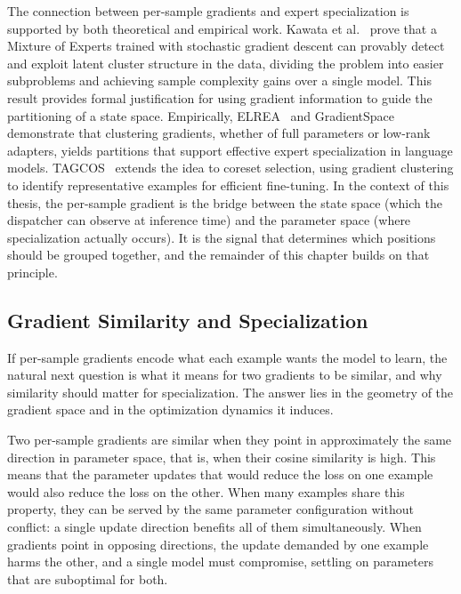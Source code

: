 The connection between per-sample gradients and expert specialization is supported by both theoretical and empirical work. Kawata et al.~\cite{kawata2025moe} prove that a Mixture of Experts trained with stochastic gradient descent can provably detect and exploit latent cluster structure in the data, dividing the problem into easier subproblems and achieving sample complexity gains over a single model. This result provides formal justification for using gradient information to guide the partitioning of a state space. Empirically, ELREA~\cite{li2025elrea} and GradientSpace~\cite{sridharan2025gradientspace} demonstrate that clustering gradients, whether of full parameters or low-rank adapters, yields partitions that support effective expert specialization in language models. TAGCOS~\cite{zhang2024tagcos} extends the idea to coreset selection, using gradient clustering to identify representative examples for efficient fine-tuning. In the context of this thesis, the per-sample gradient is the bridge between the state space (which the dispatcher can observe at inference time) and the parameter space (where specialization actually occurs). It is the signal that determines which positions should be grouped together, and the remainder of this chapter builds on that principle.

\subsection{Gradient Similarity and Specialization}\label{sec:gradient-similarity}

If per-sample gradients encode what each example wants the model to learn, the natural next question is what it means for two gradients to be similar, and why similarity should matter for specialization. The answer lies in the geometry of the gradient space and in the optimization dynamics it induces.

Two per-sample gradients are similar when they point in approximately the same direction in parameter space, that is, when their cosine similarity is high. This means that the parameter updates that would reduce the loss on one example would also reduce the loss on the other. When many examples share this property, they can be served by the same parameter configuration without conflict: a single update direction benefits all of them simultaneously. When gradients point in opposing directions, the update demanded by one example harms the other, and a single model must compromise, settling on parameters that are suboptimal for both.

